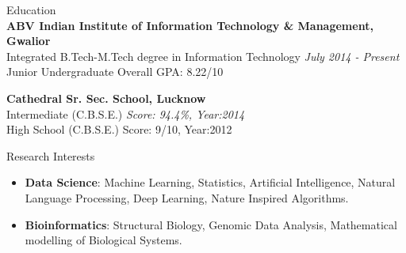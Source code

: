\documentclass{resume} %
\begin{document}

\begin{rSection}{Education}
\quad \\
{\bf ABV Indian Institute of Information Technology \& Management, Gwalior} %
\\ Integrated B.Tech-M.Tech degree in Information Technology  \hfill {\em July 2014 - Present} 
\\Junior Undergraduate  \hfill { Overall GPA: 8.22/10}

{\bf Cathedral Sr. Sec. School, Lucknow} %
\\ Intermediate (C.B.S.E.)    \hfill {\em Score: 94.4\%, Year:2014} 
\\High School (C.B.S.E.)  \hfill {Score: 9/10, Year:2012}


\end{rSection}

\begin{rSection}{Research Interests}

\begin{itemize}
\item \textbf{Data Science}: Machine Learning, Statistics, Artificial Intelligence, Natural Language Processing, Deep Learning, Nature Inspired Algorithms. 
\item \textbf{Bioinformatics}: Structural Biology, Genomic Data Analysis, Mathematical modelling of Biological Systems.
\end{itemize}
\end{rSection}


\end{document}
